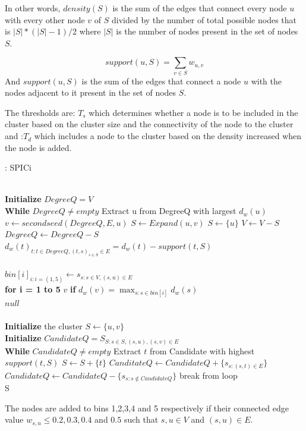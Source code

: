 \documentclass[8pt]{extarticle}
\begin{document}
	In other words, $density(S)$ is the sum of the edges that connect every node $u$ with every other node $v$ of $S$ divided by the number of total possible nodes that is $|S|*(|S|-1)/2$ where $|S|$ is the number of nodes present in the set of nodes $S$.
	
	\begin{equation}
	support(u,S) = \sum_{v\in S} w_{u,v}
	\end{equation}
	And $support(u,S)$ is the sum of the edges that connect a node $u$ with the nodes adjacent to it present in the set of nodes $S$.
	
	The thresholds are: $T_s$ which determines whether a node is to be included in the cluster based on the cluster size and the connectivity of the node to the cluster and :$T_d$ which includes a node to the cluster based on the density increased when the node is added.
	\begin{algorithm}
		\caption{: SPICi}\label{euclid}
		\begin{algorithmic}[1]
			 \\
			\textbf{Initialize} $DegreeQ = V$ \\
			\textbf{While} $DegreeQ \neq empty$
			\State Extract u from DegreeQ with largest $d_w(u)$
			\State $v \gets secondseed(DegreeQ,E,u)$
			 $S \gets Expand(u,v)$
			\EndIf
			\Else 
				\State $S \gets \{u\}$
			\EndIf
			\State $V \gets V - S $
			\State $Degree Q \gets Degree Q - S$
			\State $d_w(t)_{t:t\in DegreeQ,(t,s)_{s\in S}\in E} = d_w(t) - support(t,S)$
			\EndProcedure\\
			 \\
			$bin[i]_{i:i=(1,5)} \gets s_{s:s\in V,(s,u)\in E}$ \\
			\textbf{for i = 1 to 5}
				\State \Return $v$ \textbf{if} $d_w(v)=\max_{s:s\in bin[i]}{d_w(s)}$
			\EndIf\\
			\Return $null$
			\EndProcedure\\
			\\
			\textbf{Initialize} the cluster $S \gets \{u,v\}$ \\
			\textbf{Initialize} $CandidateQ = S_{S:s\in S,(s,u),(s,v)\in E}$\\
			\textbf{While} $CandidateQ \neq empty$
			\State Extract $t$ from Candidate with highest $support(t,S)$
				\State $S\gets S+\{t\}$
				\State $CanditateQ \gets CandidateQ + \{s_{s:(s,t)\in E}\}$
				\State $CandidateQ \gets CandidateQ - \{s_{s:s\not\in CandidateQ}\}$
				\Else
				\State break from loop
				\EndIf \\
				\Return S
			\EndProcedure
		\end{algorithmic}
	\end{algorithm}
	The nodes are added to bins 1,2,3,4 and 5 respectively if their connected edge value $w_{s,u}\leq0.2,0.3,0.4$ and $0.5$ such that $s,u\in V$ and $(s,u)\in E$.
	
\end{document}
